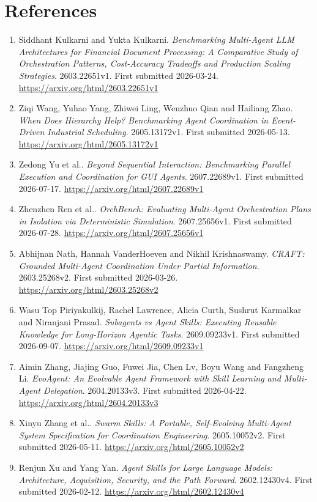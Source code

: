 \clearpage
\section*{References}
\begingroup\small
\begin{enumerate}
\item Siddhant Kulkarni and Yukta Kulkarni. \textit{Benchmarking Multi-Agent LLM Architectures for Financial Document Processing: A Comparative Study of Orchestration Patterns, Cost-Accuracy Tradeoffs and Production Scaling Strategies}. 2603.22651v1. First submitted 2026-03-24. \url{https://arxiv.org/html/2603.22651v1}
\item Ziqi Wang, Yuhao Yang, Zhiwei Ling, Wenzhuo Qian and Hailiang Zhao. \textit{When Does Hierarchy Help? Benchmarking Agent Coordination in Event-Driven Industrial Scheduling}. 2605.13172v1. First submitted 2026-05-13. \url{https://arxiv.org/html/2605.13172v1}
\item Zedong Yu et al.. \textit{Beyond Sequential Interaction: Benchmarking Parallel Execution and Coordination for GUI Agents}. 2607.22689v1. First submitted 2026-07-17. \url{https://arxiv.org/html/2607.22689v1}
\item Zhenzhen Ren et al.. \textit{OrchBench: Evaluating Multi-Agent Orchestration Plans in Isolation via Deterministic Simulation}. 2607.25656v1. First submitted 2026-07-28. \url{https://arxiv.org/html/2607.25656v1}
\item Abhijnan Nath, Hannah VanderHoeven and Nikhil Krishnaswamy. \textit{CRAFT: Grounded Multi-Agent Coordination Under Partial Information}. 2603.25268v2. First submitted 2026-03-26. \url{https://arxiv.org/html/2603.25268v2}
\item Wasu Top Piriyakulkij, Rachel Lawrence, Alicia Curth, Sushrut Karmalkar and Niranjani Prasad. \textit{Subagents vs Agent Skills: Executing Reusable Knowledge for Long-Horizon Agentic Tasks}. 2609.09233v1. First submitted 2026-09-07. \url{https://arxiv.org/html/2609.09233v1}
\item Aimin Zhang, Jiajing Guo, Fuwei Jia, Chen Lv, Boyu Wang and Fangzheng Li. \textit{EvoAgent: An Evolvable Agent Framework with Skill Learning and Multi-Agent Delegation}. 2604.20133v3. First submitted 2026-04-22. \url{https://arxiv.org/html/2604.20133v3}
\item Xinyu Zhang et al.. \textit{Swarm Skills: A Portable, Self-Evolving Multi-Agent System Specification for Coordination Engineering}. 2605.10052v2. First submitted 2026-05-11. \url{https://arxiv.org/html/2605.10052v2}
\item Renjun Xu and Yang Yan. \textit{Agent Skills for Large Language Models: Architecture, Acquisition, Security, and the Path Forward}. 2602.12430v4. First submitted 2026-02-12. \url{https://arxiv.org/html/2602.12430v4}

\end{enumerate}
